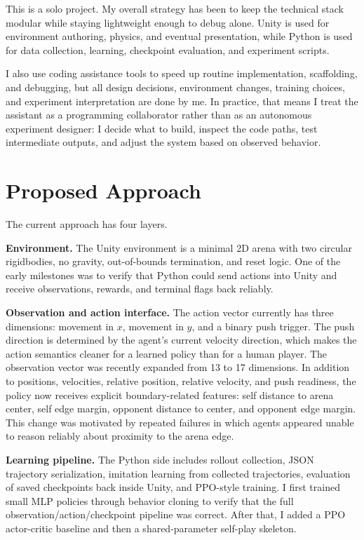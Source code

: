 \documentclass[10pt,twocolumn,letterpaper]{article}
\begin{document}
This is a solo project. My overall strategy has been to keep the technical stack modular while staying lightweight enough to debug alone. Unity is used for environment authoring, physics, and eventual presentation, while Python is used for data collection, learning, checkpoint evaluation, and experiment scripts.

I also use coding assistance tools to speed up routine implementation, scaffolding, and debugging, but all design decisions, environment changes, training choices, and experiment interpretation are done by me. In practice, that means I treat the assistant as a programming collaborator rather than as an autonomous experiment designer: I decide what to build, inspect the code paths, test intermediate outputs, and adjust the system based on observed behavior.

\section{Proposed Approach}

The current approach has four layers.

\textbf{Environment.} The Unity environment is a minimal 2D arena with two circular rigidbodies, no gravity, out-of-bounds termination, and reset logic. One of the early milestones was to verify that Python could send actions into Unity and receive observations, rewards, and terminal flags back reliably.

\textbf{Observation and action interface.} The action vector currently has three dimensions: movement in $x$, movement in $y$, and a binary push trigger. The push direction is determined by the agent's current velocity direction, which makes the action semantics cleaner for a learned policy than for a human player. The observation vector was recently expanded from 13 to 17 dimensions. In addition to positions, velocities, relative position, relative velocity, and push readiness, the policy now receives explicit boundary-related features: self distance to arena center, self edge margin, opponent distance to center, and opponent edge margin. This change was motivated by repeated failures in which agents appeared unable to reason reliably about proximity to the arena edge.

\textbf{Learning pipeline.} The Python side includes rollout collection, JSON trajectory serialization, imitation learning from collected trajectories, evaluation of saved checkpoints back inside Unity, and PPO-style training. I first trained small MLP policies through behavior cloning to verify that the full observation/action/checkpoint pipeline was correct. After that, I added a PPO actor-critic baseline and then a shared-parameter self-play skeleton.
\end{document}
